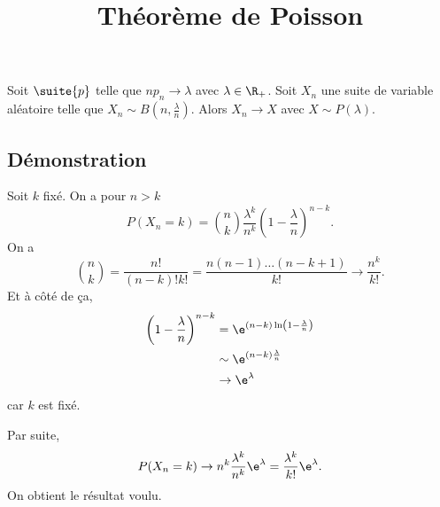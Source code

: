 \documentclass[fontsize=12pt,twoside=false,parskip=half, french, french]{scrartcl}
\title{Théorème de Poisson}
\date{}
\author{}
\begin{document}
\maketitle
   \begin{Theoreme}
      Soit $\suite{p}$ telle que $np_n \to \lambda$ avec $\lambda \in \R_+$.
      Soit $X_n$ une suite de variable aléatoire telle que $X_n \sim 
      B(n, \frac{\lambda}{n})$. Alors $X_n \to X$ avec $X \sim P(\lambda)$.
   \end{Theoreme}
   \subsection{Démonstration}
   Soit $k$ fixé. On a pour $n > k$ 
   \[
      P(X_n = k) = \binom{n}{k} \frac{\lambda^k}{n^k}
                                \left( 1-\frac{\lambda}{n}\right)^{n - k}.
   \]
   On a
   \[
      \binom{n}{k} = \frac{n!}{(n - k)!k!} = \frac{n(n - 1)\ldots(n - k + 1)}{k!} \to \frac{n^k}{k!}.
   \]
   Et à côté de ça,
   \begin{align*}
      \left(1 - \frac{\lambda}{n}\right)^{n -  k} 
      &= \e^{(n - k)\ln \left(1 - \frac{\lambda}{n}\right)}\\
      &\sim \e^{(n - k)\frac{\lambda}{n}}\\
      &\to \e^{\lambda}
   \end{align*}
   car $k$ est fixé.
   
   Par suite,
   \[
      P(X_n = k) \to n^k \frac{\lambda^k}{n^k} \e^{\lambda} 
                 = \frac{\lambda^k}{k!}\e^{\lambda}.
   \]
   On obtient le résultat voulu.
\end{document}
